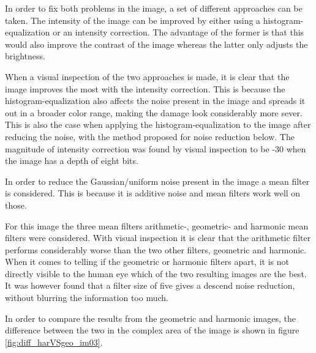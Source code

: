 In order to fix both problems in the image, a set of different approaches can be taken.
The intensity of the image can be improved by either using a histogram-equalization or an intensity correction.
The advantage of the former is that this would also improve the contrast of the image whereas the latter only adjusts the brightness.

When a visual inspection of the two approaches is made, it is clear that the image improves the most with the intensity correction.
This is because the histogram-equalization also affects the noise present in the image and spreads it out in a broader color range, making the damage look considerably more sever.
This is also the case when applying the histogram-equalization to the image after reducing the noise, with the method proposed for noise reduction below.
The magnitude of intensity correction was found by visual inspection to be -30 when the image has a depth of eight bits.


In order to reduce the Gaussian/uniform noise present in the image a mean filter is considered.
This is because it is additive noise and mean filters work well on those.

For this image the three mean filters arithmetic-, geometric- and harmonic mean filters were considered.
With visual inspection it is clear that the arithmetic filter performs considerably worse than the two other filters, geometric and harmonic.
When it comes to telling if the geometric or harmonic filters apart, it is not directly visible to the human eye which of the two resulting images are the best.
It was however found that a filter size of five gives a descend noise reduction, without blurring the information too much.

In order to compare the results from the geometric and harmonic images, the difference between the two in the complex area of the image is shown in figure \ref{fig:diff_harVSgeo_im03}.




